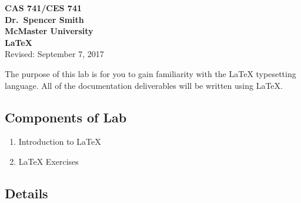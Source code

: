 \documentclass[12pt,fleqn]{article}
\newcommand{\be}{\begin{enumerate}}
\newcommand{\ee}{\end{enumerate}}
\newcommand{\bc}{\begin{center}}
\newcommand{\ec}{\end{center}}
\begin{document}
\bc

{\Large \textbf{CAS 741/CES 741}}\\[2mm]
{\large \textbf{Dr.~Spencer Smith}}\\[2mm]
{\large \textbf{McMaster University}}\\[6mm]
{\LARGE \textbf{LaTeX}}\\[4mm]
{\large Revised: September 7, 2017}

\ec

\medskip

\noindent
The purpose of this lab is for you to gain familiarity with the LaTeX
typesetting language.  All of the documentation deliverables will be written
using LaTeX.

\subsection*{Components of Lab}

\be
\item Introduction to LaTeX
\item LaTeX Exercises
\ee

\subsection*{Details}


%


\end{document}
